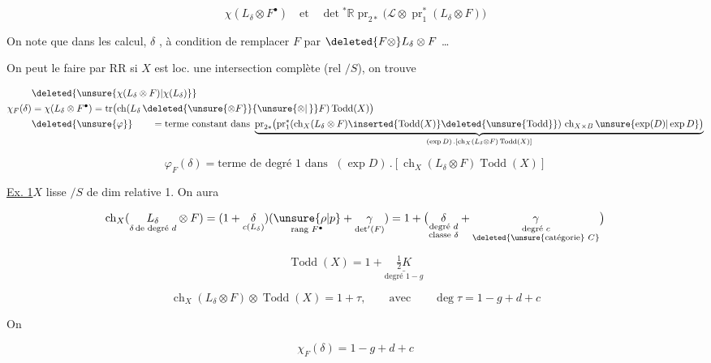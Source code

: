\[
\chi(L_\delta\otimes F^{\bullet})\quad\text{et}\quad\det{}^{*}\mathbb R\operatorname{pr}_{2*}\bigl(\mathscr L\otimes\operatorname{pr}_1^{*}(L_\delta\otimes F)\bigr)
\]

On note que dans les calcul, $\delta$ , à condition de remplacer $F$ par $\deleted{F\otimes}L_\delta\otimes F$ \ldots{}

On peut le faire par RR si $X$ est loc. une intersection complète (rel $/S$), on trouve

\[
\begin{aligned} &\deleted{\unsure{\chi(L_\delta\otimes F)|\chi(L_\delta)}}\\ \chi_F(\delta)&=\chi(L_\delta\otimes F^{\bullet})=\operatorname{tr}\bigl(\operatorname{ch}(L_\delta\,\deleted{\unsure{\otimes F}}{\unsure{\otimes|\,}}F)\operatorname{Todd}(X)\bigr)\\ &\deleted{\unsure{\varphi}}\qquad=\text{terme constant dans }\underbrace{\operatorname{pr}_{2*}\bigl(\operatorname{pr}_1^{*}(\operatorname{ch}_X(L_\delta\otimes F)\inserted{\operatorname{Todd}(X)}\deleted{\unsure{\operatorname{Todd}}})\,\operatorname{ch}_{X\times B}\unsure{\exp(D)|\exp D}\bigr)}_{(\exp D)\,.[\operatorname{ch}_X(L_\delta\otimes F)\operatorname{Todd}(X)]}\end{aligned}
\]

\[
\varphi_F(\delta)=\text{terme de degré 1 dans }\;(\exp D)\,.[\operatorname{ch}_X(L_\delta\otimes F)\operatorname{Todd}(X)]
\]

\uline{Ex. 1}\qquad $X$ lisse $/S$ de dim relative 1. On aura

\[
\operatorname{ch}_X(\underset{\delta\,\text{de degré }d}{L_\delta}\otimes F)=(1+\underset{c(L_\delta)}{\delta})(\underset{\text{rang } F^{\bullet}}{\unsure{\rho|p}}+\underset{\det^{\prime}(F)}{\gamma})=1+\bigl(\underset{\substack{\text{degré }d\\\text{classe }\delta}}{\delta}+\underset{\substack{\text{degré }c\\\deleted{\text{\unsure{catégorie} }C}}}{\gamma}\bigr)
\]

\[
\operatorname{Todd}(X)=1+\underset{\text{degré }1-g}{\underline{\tfrac12 K}}
\]

\[
\operatorname{ch}_X(L_\delta\otimes F)\otimes\operatorname{Todd}(X)=1+\tau,\qquad\text{avec}\qquad\deg\tau=1-g+d+c
\]

On  

\[
\boxed{\chi_F(\delta)=1-g+d+c}
\]

